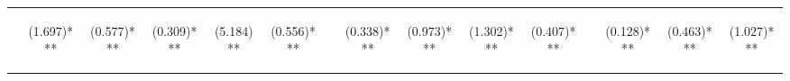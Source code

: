 \begin{center}
\begin{tabular}{lcccccccccccccc}
 & \begin{normalsize}(1.697)***\end{normalsize} & \begin{normalsize}(0.577)***\end{normalsize} & \begin{normalsize}(0.309)***\end{normalsize} & \begin{normalsize}(5.184)**\end{normalsize} & \begin{normalsize}(0.556)***\end{normalsize} & \begin{normalsize}\end{normalsize} & \begin{normalsize}(0.338)***\end{normalsize} & \begin{normalsize}(0.973)***\end{normalsize} & \begin{normalsize}(1.302)***\end{normalsize} & \begin{normalsize}(0.407)***\end{normalsize} & \begin{normalsize}\end{normalsize} & \begin{normalsize}(0.128)***\end{normalsize} & \begin{normalsize}(0.463)***\end{normalsize} & \begin{normalsize}(1.027)***\end{normalsize}\\

\end{tabular}
\end{center}

